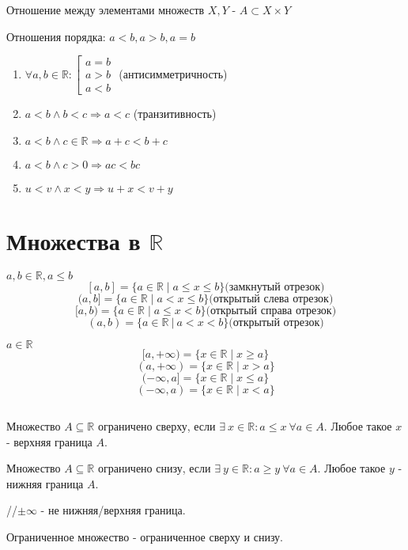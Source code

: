 \documentclass[11pt]{book}
\newcommand{\R}{\mathbb{R}}
\renewcommand{\le}{\leqslant}
\renewcommand{\ge}{\geqslant}
\theoremstyle{definition}
\theoremstyle{plain}
\theoremstyle{plain}
\theoremstyle{definition}
\theoremstyle{remark}
\begin{document}
\begin{enumerate}
\begin{defn}
	\end{defn}
	\begin{defn}
	    Отношение между элементами множеств $X, Y$ - $A \subset X \times Y$
	\end{defn}
	Отношения порядка: $a < b, a>b, a=b$
	 \begin{enumerate}
	    \item $\forall a, b \in \R: \left [ 
		    \begin{matrix}
		        a = b \\ a > b \\ a< b
		    \end{matrix}
		\right. $ (антисимметричность)
	    \item $a<b \wedge b < c \Rightarrow a < c$ (транзитивность)
	    \item $a<b \wedge c \in \R \Rightarrow a + c < b + c$ 
	    \item $a<b \wedge c > 0 \Rightarrow ac < bc$ 
	    \item $u < v \wedge x < y \Rightarrow u+x  < v + y$ 
	\end{enumerate}
\end{enumerate}
\section{Множества в $\R$ }
\begin{defn} 
    $a, b \in \R, a \le b$
    $$
    [a, b] = \{a \in \R \mid a \le x \le b\} \mbox{(замкнутый отрезок)}
    $$
    $$
    (a, b] = \{a \in \R \mid a < x \le b\} \mbox{(открытый слева отрезок)}
    $$
    $$
    [a, b) = \{a \in \R \mid a \le x < b\}  \mbox{(открытый справа отрезок)}
    $$
    $$(a, b) = \{a \in \R ~|~ a < x < b\} \mbox{(открытый отрезок)}$$
\end{defn}

\begin{defn}[Лучи] $a \in \R$
$$[a, +\infty) = \{x \in \R \mid x \ge a\}$$
$$(a, +\infty) = \{x \in \R \mid x > a\}  $$
$$(-\infty, a] = \{x \in \R \mid x \le a\}$$
$$ (-\infty, a) =\{x \in \R \mid x < a\}$$
\end{defn}

\begin{defn}$ $

Множество $A \subseteq \R$ ограничено сверху, если $\exists ~x \in \R: a \le x ~\forall a \in A$. Любое такое $x$ - верхняя граница      $A$.

Множество $A \subseteq \R$ ограничено снизу, если $\exists ~y \in \R: a \ge y ~\forall a \in A$. Любое такое $y$ - нижняя граница $     A$.

//$\pm\infty$ - не нижняя/верхняя граница.

Ограниченное множество - ограниченное сверху и снизу. 
\end{defn}
\end{document}
